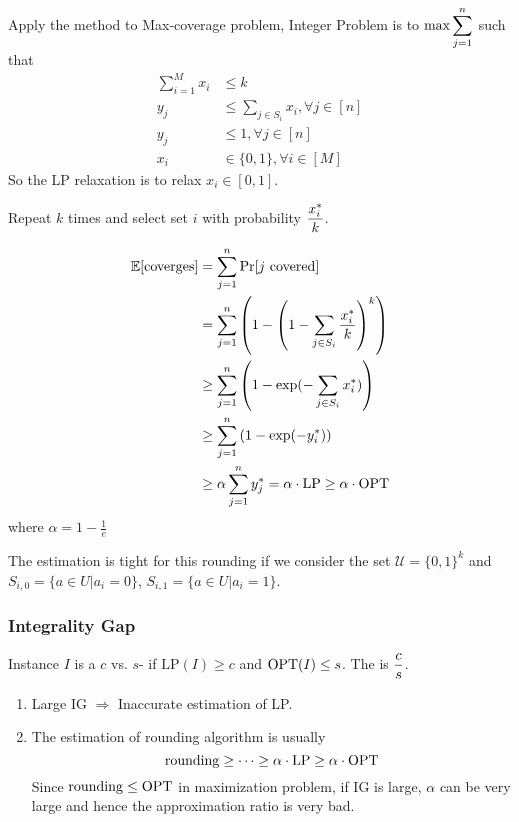 Apply the method to Max-coverage problem, Integer Problem is to  $\max \displaystyle\sum_{j=1}^n$ such that 
\begin{align*}
    \sum_{i=1}^M x_i &\leq k\\
    y_j& \leq \sum_{j\in S_i}x_i,\forall j\in [n]\\
    y_j& \leq 1,\forall j\in [n]\\
    x_i&\in\{0,1\},\forall i\in [M]
\end{align*} 
So the LP relaxation is to relax  $ x_i\in [0,1] $. 

Repeat  $ k  $ times and select set  $ i  $ with probability  $ \displaystyle\frac{x_i^*}{k} $.

\begin{align*}
    \mathbb E[\text{coverges}]& =\sum_{j=1}^n\mathrm{Pr}[j\text{ covered}]\\
    &=\sum_{j=1}^n\left(1-\left(1-\sum_{j\in S_i}\frac{x_i^*}{k}\right)^k\right)\\
    & \geq \sum_{j=1}^n\left(1-\exp(-\sum_{j\in S_i}x_i^*)\right)\\
    & \geq \sum_{j=1}^n\left(1-\exp(-y_i^*)\right)\\
    & \geq \alpha\sum_{j=1}^n y_j^*=\alpha\cdot \mathrm{LP} \geq \alpha\cdot \mathrm{OPT}
\end{align*}
where  $ \alpha=1-\frac{1}{e} $ 

The estimation is tight for this rounding if we consider the set  $ \mathcal{U}=\{0,1\}^k $ and  $ S_{i,0}=\{a\in U|a_i=0\} $,  $ S_{i,1}=\{a\in U|a_i=1\} $.   


\subsubsection{Integrality Gap}
Instance  $ I  $ is a  $ c $ vs.  $ s $- if  $ \mathrm{LP}(I) \geq c $ and  $ \mathrm{OPT}(I) \leq s $. The  is  $\displaystyle \frac{c}{s} $. 

\begin{enumerate}
    \item Large IG $ \Rightarrow  $ Inaccurate estimation of LP.
    \item The estimation of rounding algorithm is usually 
    \[\mathrm{rounding } \geq \cdots \geq \alpha\cdot\mathrm{LP} \geq \alpha\cdot\mathrm{OPT}\]
    Since  $ \mathrm{rounding} \leq \mathrm{OPT} $ in maximization problem, if IG is large,  $ \alpha $ can be very large and hence the approximation ratio is very bad. 
\end{enumerate}

